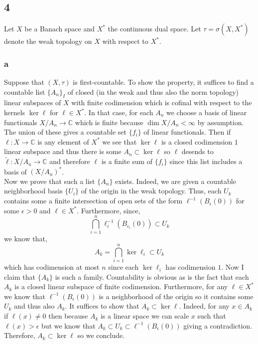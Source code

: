 \documentclass[12pt]{article}
\renewcommand{\C}{\mathbb{C}}
\begin{document}
\subsection{4}

Let $X$ be a Banach space and $X^*$ the continuous dual space. Let $\tau = \sigma(X, X^*)$ denote the weak topology on $X$ with respect to $X^*$.

\subsubsection{a}

Suppose that $(X, \tau)$ is first-countable. To show the property, it suffices to find a countable list $\{ A_n \}_I$ of closed (in the weak and thus also the norm topology) linear subspaces of $X$ with finite codimension which is cofinal with respect to the kernels $\ker{\ell}$ for $\ell \in X^*$. In that case, for each $A_n$ we choose a basis of linear functionals $X / A_n \to \C$ which is finite because $\dim{X / A_n} < \infty$ by assumption. The union of these gives a countable set $\{ f_i \}$ of linear functionals. Then if $\ell : X \to \C$ is any element of $X^*$ we see that $\ker{\ell}$ is a closed codimension $1$ linear subspace and thus there is some $A_n \subset \ker{\ell}$ so $\ell$ desends to $\tilde{\ell} : X / A_n \to \C$ and therefore $\ell$ is a finite sum of $\{ f_i \}$ since this list includes a basis of $(X / A_n)^*$.
\bigskip\\
Now we prove that such a list $\{ A_n \}$ exists. Indeed, we are given a countable neighborhood basis $\{U_i \}$ of the origin in the weak topology. Thus, each $U_k$ contains some a finite intersection of open sets of the form $\ell^{-1}(B_\epsilon(0))$ for some $\epsilon > 0$ and $\ell \in X^*$. Furthermore, since,
\[ \bigcap_{i = 1}^n \ell_i^{-1}(B_{\epsilon_i}(0)) \subset U_k \]
we know that,
\[ A_k = \bigcap_{i = 1}^n \ker{\ell_i} \subset U_k \]
which has codimension at most $n$ since each $\ker{\ell_i}$ has codimension $1$. Now I claim that $\{ A_k \}$ is such a family. Countability is obvious as is the fact that each $A_k$ is a closed linear subspace of finite codimension. Furthermore, for any $\ell \in X^*$ we know that $\ell^{-1}(B_\epsilon(0))$ is a neighborhood of the origin so it contains some $U_k$ and thus also $A_k$. It suffices to show that $A_k \subset \ker{\ell}$. Indeed, for any $x \in A_k$ if $\ell(x) \neq 0$ then because $A_k$ is a linear space we can scale $x$ such that $\ell(x) > \epsilon$ but we know that $A_k \subset U_k \subset \ell^{-1}(B_\epsilon(0))$ giving a contradiction. Therefore, $A_k \subset \ker{\ell}$ so we conclude.
\end{document}
